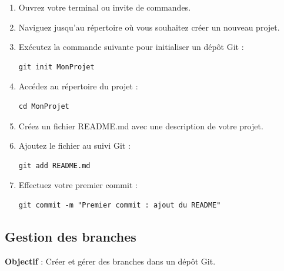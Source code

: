 \begin{enumerate}
	\item Ouvrez votre terminal ou invite de commandes.
	\item Naviguez jusqu'au répertoire où vous souhaitez créer un nouveau projet.
	\item Exécutez la commande suivante pour initialiser un dépôt Git :
	\begin{verbatim}
git init MonProjet
	\end{verbatim}
	\item Accédez au répertoire du projet :
	\begin{verbatim}
cd MonProjet
	\end{verbatim}
	\item Créez un fichier README.md avec une description de votre projet.
	\item Ajoutez le fichier au suivi Git :
	\begin{verbatim}
git add README.md
	\end{verbatim}
	\item Effectuez votre premier commit :
	\begin{verbatim}
git commit -m "Premier commit : ajout du README"
	\end{verbatim}
\end{enumerate}

\subsection*{Gestion des branches}
{}
\noindent \textbf{Objectif} : Créer et gérer des branches dans un dépôt Git.

